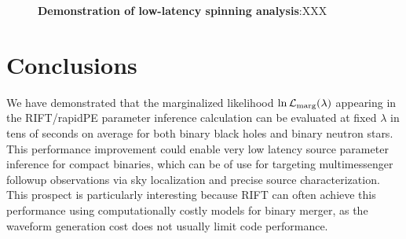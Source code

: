 \documentclass[twocolumn,prd,nofootinbib]{revtex4}
\newcommand\SkipForEarlyCirculation[1]{}
\newcommand\editremark[1]{{\color{red} #1}}
\begin{document}
\begin{figure}

\caption{\label{fig:BNS:Spin}\textbf{Demonstration of low-latency spinning analysis}:XXX
}
\end{figure}


\SkipForEarlyCirculation{
\section{ Results (optional?)}

*   Rerun all O2 BBHs with SEOBNRv3?  

* PP plot demo for zero-spin binaries, with profiling of full run?  

* reminder: HM for BNS break degeneracy, useful for source classification.  Show an example.

\editremark{bonus mentions}: eccentricity

Bonus code: lnLcut tapering, possibly neff tapering

Puffball in DAG every few iterations, to insure stability around edges and not overcover the core

}

\section{Conclusions}
\label{sec:conclude}
We have demonstrated that the marginalized likelihood $\ln {\cal L}_{\rm marg}(\lambda)$ appearing in the RIFT/rapidPE parameter
inference calculation can be evaluated at fixed $\lambda$ in tens of seconds on average for
both binary black holes and binary neutron stars.  This performance improvement could enable very low latency source
parameter inference for compact binaries, which can be of use for targeting multimessenger followup observations via sky
localization and  precise source characterization.     This prospect is particularly interesting because RIFT can
often achieve this performance using computationally costly models for binary merger, as the waveform generation cost
does not usually limit code performance.   
\end{document}

